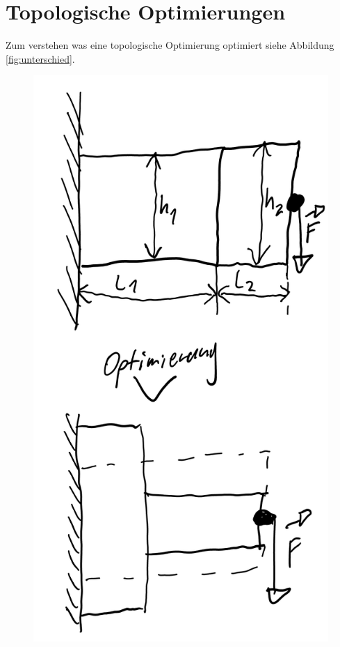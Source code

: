 \documentclass{article}
\begin{document}
\section{Topologische Optimierungen}
\label{sec:topo-opt}
Zum verstehen was eine topologische Optimierung optimiert siehe Abbildung \ref{fig:unterschied}.
\begin{figure}[htbp]
          \begin{minipage}{0.2\textwidth}
            \centering
            \includegraphics[width=\linewidth]{figures/Groesen-opt.png}

\end{minipage}
\end{figure}
\end{document}
